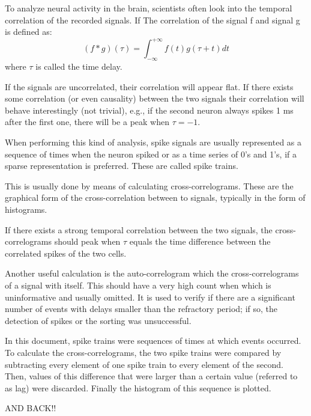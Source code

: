 \documentclass{article}
\begin{document}
To analyze neural activity in the brain, scientists often look into the temporal correlation of the recorded signals. If The correlation of the signal f and signal g is defined as:
\begin{equation}
\left( f * g \right) \left( \tau \right) = \int_{- \infty }^{ + \infty } f \left( t \right) g \left( \tau + t \right) dt
\label{eq:CCdefinition}
\end{equation}
where $\tau$ is called the time delay.

If the signals are uncorrelated, their correlation will appear flat. If there exists some correlation (or even causality) between the two signals their correlation will behave interestingly (not trivial), e.g., if the second neuron always spikes 1 ms after the first one, there will be a peak when $\tau = -1$.

When performing this kind of analysis, spike signals are usually represented as a sequence of times when the neuron spiked or as a time series of 0's and 1's, if a sparse representation is preferred. These are called spike trains.

This is usually done by means of calculating cross-correlograms. These are the graphical form of the cross-correlation between to signals, typically in the form of histograms.

If there exists a strong temporal correlation between the two signals, the cross-correlograms should peak when $\tau$   equals the time difference between the correlated spikes of the two cells. 

Another useful calculation is the auto-correlogram which the cross-correlograms of a signal with itself. This should have a very high count when  which is uninformative and usually omitted. It is used to verify if there are a significant number of events with delays smaller than the refractory period; if so, the detection of spikes or the sorting was unsuccessful.

In this document, spike trains were sequences of times at which events occurred. To calculate the cross-correlograms, the two spike trains were compared by subtracting every element of one spike train to every element of the second. Then, values of this difference that were larger than a certain value (referred to as lag) were discarded. Finally the histogram of this sequence is plotted.


AND BACK!!
\end{document}
